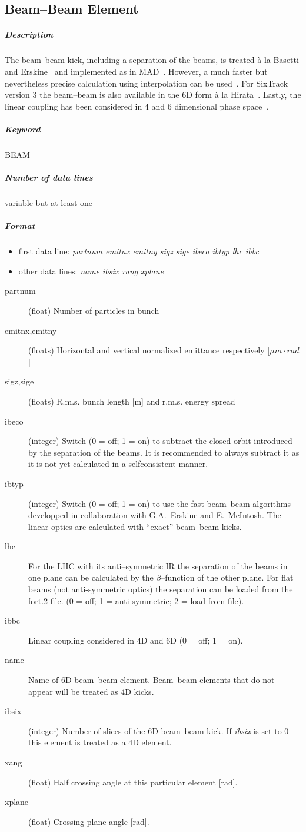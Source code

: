 \documentclass[a4paper,11pt]{report}
\begin{document}
\subsection{Beam--Beam Element} \label{BeamBeam}

\subparagraph{Description} The beam--beam kick, including a separation
of the beams, is treated \`{a} la Basetti and Erskine~\cite{BasErs}
and implemented as in MAD~\cite{MAD}. However, a much faster but
nevertheless precise calculation using interpolation can be
used~\cite{ERIC}. For SixTrack version 3 the beam--beam is also
available in the 6D form \`{a} la Hirata~\cite{Hirata}. Lastly, the
linear coupling has been considered in 4 and 6 dimensional phase
space~\cite{ripbeam}. 

\subparagraph{Keyword} BEAM 
\subparagraph{Number of data lines} variable but at least one

\subparagraph{Format} 
\begin{itemize}
\item first data line: {\em partnum emitnx emitny sigz sige ibeco
    ibtyp lhc ibbc} 
\item other data lines: {\em name ibsix xang xplane}
\end{itemize}

\begin{description}
\item [partnum] (float) Number of particles in bunch
\item [emitnx,emitny] (floats) Horizontal and vertical normalized
  emittance respectively [$\mu m\cdot rad$]
\item [sigz,sige] (floats) R.m.s. bunch length [m] and r.m.s. energy
  spread
\item [ibeco] (integer) Switch (0 = off; 1 = on) to subtract the
  closed orbit introduced by the separation of the beams. It is
  recommended to always subtract it as it is not yet calculated in a
  selfconsistent manner.
\item [ibtyp] (integer) Switch (0 = off; 1 = on) to use the fast
  beam--beam algorithms developped in collaboration with G.A.~Erskine
  and E.~McIntosh.  The linear optics are calculated with ``exact''
  beam--beam kicks.
\item [lhc] For the LHC with its anti--symmetric IR the separation of
  the beams in one plane can be calculated by the $\beta$--function of
  the other plane. For flat beams (not anti-symmetric optics) the separation
  can be loaded from the fort.2 file. (0 = off; 1 = anti-symmetric; 2 = load from file).
\item [ibbc] Linear coupling considered in 4D and 6D (0 = off; 1 = on).
\item [name] Name of 6D beam--beam element. Beam--beam elements that
  do not appear will be treated as 4D kicks.
\item [ibsix] (integer) Number of slices of the 6D beam--beam kick.
  If {\it ibsix} is set to 0 this element is treated as a 4D element.
\item [xang] (float) Half crossing angle at this particular element [rad].
\item [xplane] (float) Crossing plane angle [rad].
\end{description}
\end{document}
